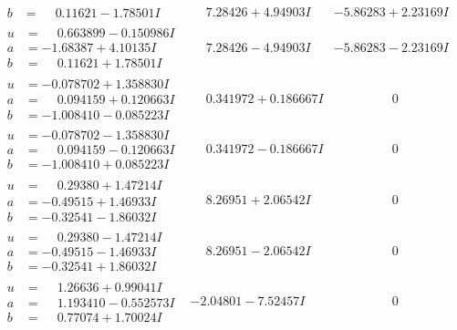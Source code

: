 \documentclass[1p]{elsarticle_modified}
\theoremstyle{definition}
\begin{document}
$$\begin{array}{c|c|c}
\begin{aligned}
b &= \phantom{-}0.11621 - 1.78501 I\end{aligned}
 & \phantom{-}7.28426 + 4.94903 I & -5.86283 + 2.23169 I \\ \hline\begin{aligned}
u &= \phantom{-}0.663899 - 0.150986 I \\
a &= -1.68387 + 4.10135 I \\
b &= \phantom{-}0.11621 + 1.78501 I\end{aligned}
 & \phantom{-}7.28426 - 4.94903 I & -5.86283 - 2.23169 I \\ \hline\begin{aligned}
u &= -0.078702 + 1.358830 I \\
a &= \phantom{-}0.094159 + 0.120663 I \\
b &= -1.008410 - 0.085223 I\end{aligned}
 & \phantom{-}0.341972 + 0.186667 I & \phantom{-0.000000 } 0 \\ \hline\begin{aligned}
u &= -0.078702 - 1.358830 I \\
a &= \phantom{-}0.094159 - 0.120663 I \\
b &= -1.008410 + 0.085223 I\end{aligned}
 & \phantom{-}0.341972 - 0.186667 I & \phantom{-0.000000 } 0 \\ \hline\begin{aligned}
u &= \phantom{-}0.29380 + 1.47214 I \\
a &= -0.49515 + 1.46933 I \\
b &= -0.32541 - 1.86032 I\end{aligned}
 & \phantom{-}8.26951 + 2.06542 I & \phantom{-0.000000 } 0 \\ \hline\begin{aligned}
u &= \phantom{-}0.29380 - 1.47214 I \\
a &= -0.49515 - 1.46933 I \\
b &= -0.32541 + 1.86032 I\end{aligned}
 & \phantom{-}8.26951 - 2.06542 I & \phantom{-0.000000 } 0 \\ \hline\begin{aligned}
u &= \phantom{-}1.26636 + 0.99041 I \\
a &= \phantom{-}1.193410 - 0.552573 I \\
b &= \phantom{-}0.77074 + 1.70024 I\end{aligned}
 & -2.04801 - 7.52457 I & \phantom{-0.000000 } 0 \\ \hline\begin{aligned}

\end{aligned}
\end{array}$$
\end{document}
